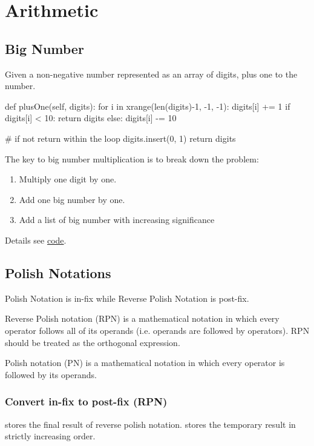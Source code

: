 \chapter{Arithmetic}


\section{Big Number}
 Given a non-negative number represented as an array of digits, plus one to the number.
\begin{python}
def plusOne(self, digits):
    for i in xrange(len(digits)-1, -1, -1):
        digits[i] += 1
        if digits[i] < 10:
            return digits
        else:
            digits[i] -= 10

    # if not return within the loop 
    digits.insert(0, 1)
    return digits
\end{python}

 The key to big number multiplication is to break down the problem:
\begin{enumerate}
\item Multiply one digit by one.
\item Add one big number by one.
\item Add a list of big number with increasing significance
\end{enumerate}
Details see \href{https://github.com/algorhythms/LeetCode/blob/master/042%20Multiply%20Strings.py}{code}.

\section{Polish Notations}
Polish Notation is in-fix while Reverse Polish Notation is post-fix. 

Reverse Polish notation (RPN) is a mathematical notation in which every operator follows all of its operands (i.e. operands are followed by operators). RPN should be treated as the orthogonal expression.  

Polish notation (PN) is a mathematical notation in which every operator is followed by its operands. 

\subsection{Convert in-fix to post-fix (RPN)}
 stores the final result of reverse polish notation.  stores
the temporary result in strictly increasing order. 

